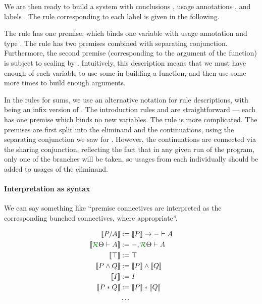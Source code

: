 \exItypes{} \exIlabels{}

We are then ready to build a system  with conclusions
, usage annotations , and labels
.
The rule corresponding to each label is given in the following.

The  rule has one premise, which binds one
variable with usage annotation  and type .
The  rule has two premises combined with
separating conjunction.
Furthermore, the second premise (corresponding to the argument of the function)
is subject to scaling by .
Intuitively, this description means that we must have enough of each variable to
use some in building a function, and then use some more  times to
build enough arguments.

\exIfunrules{}

In the rules for sums, we use an alternative notation for rule descriptions,
with \AgdaFunction{{---}{---}} being an infix version of
.
The introduction rules  and
 are straightforward --- each has one
premise which binds no new variables.
The  rule is more complicated.
The premises are first split into the eliminand and the continuations, using the
separating conjunction we saw for .
However, the continuations are connected via the sharing conjunction, reflecting
the fact that in any given run of the program, only one of the branches will be
taken, so usages from each individually should be added to usages of the
eliminand.

\exIsumrules{}

\paragraph{Interpretation as syntax}
We can say something like ``premise connectives are interpreted as the
corresponding bunched connectives, where appropriate''.

\begin{align*}
  \sem{P/A} &:= \sem P \to {- \vdash A} \\
  \sem{\grR\Theta \vdash A} &:= {-, \grR\Theta \vdash A} \\
  \sem{\top} &:= \top \\
  \sem{P \wedge Q} &:= \sem P \wedge \sem Q \\
  \sem{I} &:= I \\
  \sem{P * Q} &:= \sem P * \sem Q \\
  &\ldots
\end{align*}

